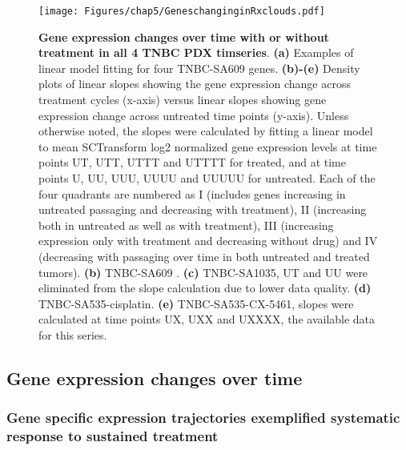 \begin{figure}
\centering
 \texttt{[image: Figures/chap5/GeneschanginginRxclouds.pdf]}
\caption[Gene expression changes over time with or without treatment in all 4 TNBC PDX timseries]
	{\small
	 \textbf{Gene expression changes over time with or without treatment in all 4 TNBC PDX timseries}.
\textbf{(a)} Examples of linear model fitting for four TNBC-SA609 genes. \textbf{(b)-(e)} Density plots of linear slopes showing the gene expression change across treatment cycles (x-axis) versus linear slopes showing gene expression change across untreated time points (y-axis). Unless otherwise noted, the slopes were calculated by fitting a linear model to mean SCTransform log2 normalized gene expression levels at time points UT, UTT, UTTT and UTTTT for treated, and at time points U, UU, UUU, UUUU and UUUUU for untreated. Each of the four quadrants are numbered as I (includes genes increasing in untreated passaging and decreasing with treatment), II (increasing both in untreated as well as with treatment), III (increasing expression only with treatment and decreasing without drug) and  IV (decreasing with passaging over time in both untreated and treated tumors).  \textbf{(b)} TNBC-SA609 . \textbf{(c)} TNBC-SA1035, UT and UU were eliminated from the slope calculation due to lower data quality. \textbf{(d)} TNBC-SA535-cisplatin. \textbf{(e)} TNBC-SA535-CX-5461, slopes were calculated at time points UX, UXX and UXXXX, the available data for this series.}

	\label{fig:GeneschanginginRxclouds}
\end{figure}


\subsection{Gene expression changes over time}

\subsubsection{Gene specific expression trajectories exemplified systematic response to sustained treatment}

